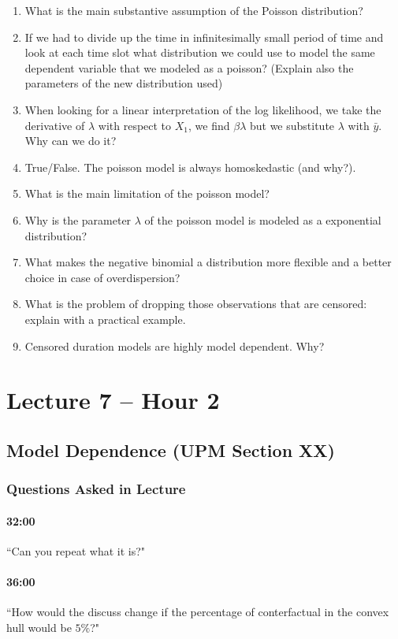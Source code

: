 \documentclass[11pt]{article}
\begin{document}
\begin{enumerate}
\item What is the main substantive assumption of the Poisson distribution? 
\item If we had to divide up the time in infinitesimally small period of time and look at each time slot what distribution we could use to model the same dependent variable that we modeled as a poisson? (Explain also the parameters of the new distribution used)
\item When looking for  a linear interpretation of the log likelihood, we take the derivative of $\lambda$ with respect to $X_1$, we find $\beta \lambda$ but we substitute $\lambda$ with $\bar{y}$. Why can we do it?
\item True/False. The poisson model is always homoskedastic (and why?). 
\item What is the main  limitation of the poisson model?  
\item Why is the parameter $\lambda$ of the poisson model is modeled as a exponential distribution?
\item What makes the negative binomial a distribution more flexible and a better choice in case of overdispersion? 
\item What is the problem of dropping those observations that are censored: explain with  a practical example.
\item Censored duration models are highly model dependent. Why?
\end{enumerate}

\section{Lecture 7 -- Hour 2}

\subsection{Model Dependence (UPM Section XX)}
\subsubsection{Questions Asked in Lecture}

\paragraph{32:00} ``Can you repeat what it is?"
\paragraph{36:00} ``How would the discuss change if the percentage of conterfactual in the convex hull would be $5\%$?"
\end{document}
